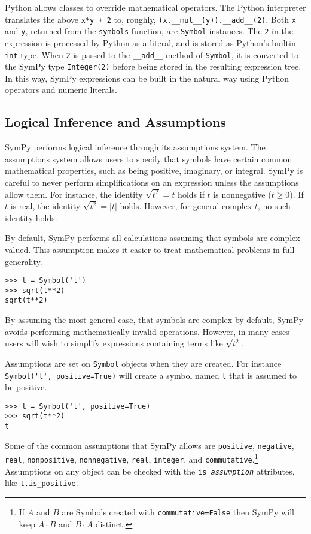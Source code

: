 Python allows classes to override mathematical operators. The Python
interpreter translates the above \texttt{x*y + 2} to, roughly,
\verb|(x.__mul__(y)).__add__(2)|. Both \texttt{x} and \texttt{y}, returned
from the \texttt{symbols} function, are \texttt{Symbol} instances. The
\texttt{2} in the expression is processed by Python as a literal, and is
stored as Python's builtin \texttt{int} type. When \texttt{2} is passed to the
\verb|__add__| method of \texttt{Symbol}, it is converted to the SymPy type
\verb|Integer(2)| before being stored in the resulting expression tree. In
this way, SymPy expressions can be built in the natural way using Python
operators and numeric literals.

\subsection{Logical Inference and Assumptions}

SymPy performs logical inference through its assumptions system. The
assumptions system allows users to specify that symbols have certain common
mathematical properties, such as being positive, imaginary, or integral. SymPy
is careful to never perform simplifications on an expression unless the
assumptions allow them. For instance, the identity $\sqrt{t^2} = t$ holds if
$t$ is nonnegative ($t\ge 0$). If $t$ is real, the identity $\sqrt{t^2}=|t|$
holds. However, for general complex $t$, no such identity holds.

By default, SymPy performs all calculations assuming that symbols are
complex valued. This assumption makes it easier to treat mathematical problems
in full generality.
\begin{verbatim}
>>> t = Symbol('t')
>>> sqrt(t**2)
sqrt(t**2)
\end{verbatim}

By assuming the most general case, that symbols are complex by default, SymPy
avoids performing mathematically invalid operations. However, in many cases
users will wish to simplify expressions containing terms like $\sqrt{t^2}$.

Assumptions are set on \texttt{Symbol} objects when they are created. For
instance \verb|Symbol('t', positive=True)| will create a symbol named
\texttt{t} that is assumed to be positive.
\begin{verbatim}
>>> t = Symbol('t', positive=True)
>>> sqrt(t**2)
t
\end{verbatim}

Some of the common assumptions that SymPy allows are \texttt{positive},
\texttt{negative}, \texttt{real}, \texttt{nonpositive}, \texttt{nonnegative},
\texttt{real}, \texttt{integer}, and \texttt{commutative}.\footnote{If $A$ and
$B$ are Symbols created with \texttt{commutative=False} then SymPy will keep
$A\cdot B$ and $B\cdot A$ distinct.} Assumptions on any object can be checked with the
\verb|is_|\texttt{\textit{assumption}} attributes, like \verb|t.is_positive|.

